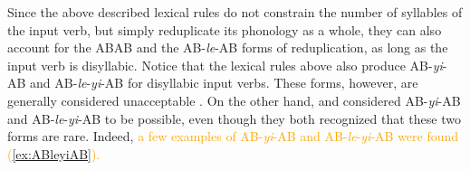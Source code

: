 \documentclass[11pt,a4paper,fleqn,draft]{article}
\newcommand{\type}[1]{{\normalfont\itshape #1\/}}
\newcommand{\phonliste}[1]{%
\mbox{%
$%
%
\left\langle \mbox{\normalfont\itshape#1} \right\rangle%
$%
}%
}
\newcommand{\changed}[1]{\textcolor{orange}{#1}}
\let\textbf\emph
\begin{document}



Since the above described lexical rules do not constrain the number of syllables of the input verb, but simply reduplicate its phonology  as a whole,
they can also account for the ABAB and the AB-\emph{le}-AB forms of reduplication,
as long as the input verb is disyllabic.
Notice that  the lexical rules above also produce AB-\emph{yi}-AB and AB\hyp{}\emph{le}\hyp{}\emph{yi}\hyp{}AB for disyllabic input verbs.
These forms, however, are generally considered unacceptable \citetext{\citealp[160]{BascianoMelloni2017}, \citealp[275--276]{Hong1999}, \citealp[30]{LiThompson1981}, \citealp[239]{YangWei2017}}.
On the other hand, \citet[269]{Fan1964} and \citet[143]{Sui2018} considered AB-\emph{yi}-AB and AB-\emph{le}-\emph{yi}-AB to be possible, even though they both recognized that these two forms are rare.
Indeed, \changed{a few examples of AB-\emph{yi}-AB and AB-\emph{le}-\emph{yi}-AB were found (\ref{ex:ABleyiAB}).}

\ea\label{ex:ABleyiAB}
 
 
\end{document}
